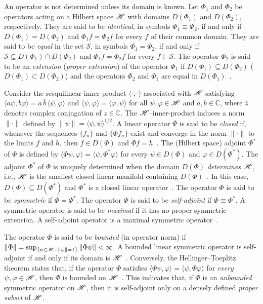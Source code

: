 \documentclass[amsa]{ipart}
\begin{document}
An operator is not determined unless its domain is known. Let $\Phi_1$
and $\Phi_2$ be operators acting on a Hilbert space $\mathscr{H}$ with domains
$D(\Phi_1)$ and $D(\Phi_2)$, 
respectively. They are said to be \emph{identical}, in symbols
$\Phi_1\equiv\Phi_2$, if and only if $D(\Phi_1)=D(\Phi_2)$ and $\Phi_1 f=\Phi_2 f$ for every
$f$ of their common domain. They are said to be \emph{equal} in
the set $\mathscr{S}$, in symbols $\Phi_1=\Phi_2$, if and only if
$\mathscr{S}\subseteq D(\Phi_1)\cap D(\Phi_2)$ and $\Phi_1 f=\Phi_2 f$ for every
$f\in\mathscr{S}$. The operator $\Phi_2$ is said to be an \emph{extension}
(\emph{proper extension}) of the operator $\Phi_1$ if $D(\Phi_1)\subseteq D(\Phi_2)$
($D(\Phi_1)\subset D(\Phi_2)$) and the operators $\Phi_2$ and $\Phi_1$ are equal in
$D(\Phi_1)$~\cite{Stone:64}.   


Consider the sesquilinear inner-product $\langle\cdot,\cdot\rangle$ associated with $\mathscr{H}$
satisfying $\langle a\psi,b\varphi\rangle=a\,\overline{b}\,\langle\psi,\varphi\rangle$ and
$\langle\psi,\varphi\rangle=\overline{\langle\varphi,\psi\rangle}$ for all $\psi,\varphi\in\mathscr{H}$ and $a,b\in\mathbb{C}$, where
$\overline{z}$ denotes complex conjugation of $z\in\mathbb{C}$.
The $\mathscr{H}$--inner-product induces a norm $\|\cdot\|$ defined by
$\|\psi\|=\langle\psi,\psi\rangle^{1/2}$. A linear operator $\Phi$ is said to be \emph{closed}
if, whenever the sequences $\{f_n\}$ and $\{\Phi f_n\}$ exist and converge in
the norm $\|\cdot\|$ to the limits $f$ and $h$, then $f\in D(\Phi)$ and $\Phi
f=h$~\cite{Stone:64}. The (Hilbert space) adjoint $\Phi^*$ of $\Phi$ is 
defined by $\langle\Phi\psi,\varphi\rangle=\langle\psi,\Phi^*\varphi\rangle$ for every $\psi\in D(\Phi)$ and $\varphi\in D(\Phi^*)$. The
adjoint $\Phi^*$ of $\Phi$ is uniquely determined when the domain $D(\Phi)$
\emph{determines} $\mathscr{H}$, i.e., $\mathscr{H}$ is the smallest closed linear
manifold containing $D(\Phi)$~\cite{Stone:64}. In this case, $D(\Phi)\subseteq
D(\Phi^*)$ and $\Phi^*$ is a closed linear operator~\cite{Stone:64}. The
operator $\Phi$ is said to be \emph{symmetric} if $\Phi=\Phi^*$. The operator
$\Phi$ is said to be \emph{self-adjoint} if $\Phi\equiv\Phi^*$. A symmetric operator
is said to be \emph{maximal} if it has no proper symmetric
extension. A self-adjoint operator is a maximal symmetric
operator~\cite{Stone:64}. 



The operator $\Phi$ is said to be \emph{bounded} (in operator norm) if
$\|\Phi\|=\sup_{\{\psi\in\mathscr{H}   \,:\, \|\psi\|=1\}}\|\Phi\psi\|<\infty$. A bounded linear symmetric
operator is self-adjoint if and only if its domain is
$\mathscr{H}$~\cite{Stone:64}. Conversely, the Hellinger--Toeplitz theorem
states that, if the operator $\Phi$ satisfies $\langle\Phi\psi,\varphi\rangle=\langle\psi,\Phi\varphi\rangle$ for \emph{every}
$\psi,\varphi\in\mathscr{H}$, then $\Phi$ is bounded on
$\mathscr{H}$~\cite{Reed-1980,Stone:64}. This indicates that, if $\Phi$ is an
\emph{unbounded} symmetric operator on $\mathscr{H}$, then it is self-adjoint
only on a densely defined \emph{proper subset} of $\mathscr{H}$. 
\end{document}
